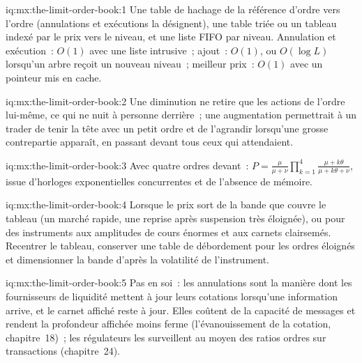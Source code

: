 \begin{solution}{iq:mx:the-limit-order-book:1}
Une table de hachage de la référence d'ordre vers l'ordre (annulations et exécutions la désignent), une table triée ou un tableau indexé par le prix vers le niveau, et une liste FIFO
par niveau. Annulation et exécution~: $O(1)$ avec une liste intrusive~; ajout~: $O(1)$, ou $O(\log L)$ lorsqu'un arbre reçoit un nouveau niveau~; meilleur prix~: $O(1)$ avec un
pointeur mis en cache. 
\end{solution}

\begin{solution}{iq:mx:the-limit-order-book:2}
Une diminution ne retire que les actions de l'ordre lui-même, ce qui ne nuit à personne derrière~; une augmentation permettrait à un trader de tenir la tête avec un petit ordre et
de l'agrandir lorsqu'une grosse contrepartie apparaît, en passant devant tous ceux qui attendaient. 
\end{solution}

\begin{solution}{iq:mx:the-limit-order-book:3}
Avec quatre ordres devant~: $P=\tfrac{\mu}{\mu+\nu}\prod_{k=1}^{4}\tfrac{\mu+k\theta}{\mu+k\theta+\nu}$, issue d'horloges exponentielles concurrentes et de l'absence de mémoire.
\end{solution}

\begin{solution}{iq:mx:the-limit-order-book:4}
Lorsque le prix sort de la bande que couvre le tableau (un marché rapide, une reprise après suspension très éloignée), ou pour des instruments aux amplitudes de cours énormes et aux carnets clairsemés.
Recentrer le tableau, conserver une table de débordement pour les ordres éloignés et dimensionner la bande d'après la volatilité de l'instrument. 
\end{solution}

\begin{solution}{iq:mx:the-limit-order-book:5}
Pas en soi~: les annulations sont la manière dont les fournisseurs de liquidité mettent à jour leurs cotations lorsqu'une information arrive, et le carnet affiché reste à jour. Elles coûtent
de la capacité de messages et rendent la profondeur affichée moins ferme (l'évanouissement de la cotation, chapitre~18)~; les régulateurs les surveillent au moyen des ratios ordres sur transactions (chapitre~24).
\end{solution}

